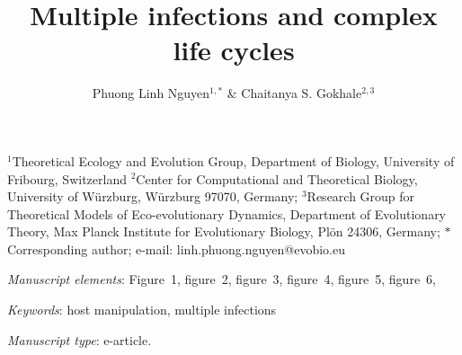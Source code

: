 \documentclass[11pt]{article}
\title{Multiple infections and complex life cycles}
\author{Phuong Linh Nguyen$^{1,\ast}$ \& 
Chaitanya S. Gokhale$^{2,3}$
}
\date{}
\begin{document}
\maketitle

%
\noindent{} $^1$Theoretical Ecology and Evolution Group, Department of Biology, University of Fribourg, Switzerland
\noindent{} $^2$Center for Computational and Theoretical Biology, University of W\"{urzburg}, W\"{urzburg} 97070, Germany;
\noindent{} $^3$Research Group for Theoretical Models of Eco-evolutionary Dynamics, Department of Evolutionary Theory, Max Planck Institute for Evolutionary Biology, Pl\"{o}n 24306, Germany;
%
\noindent{} $\ast$ Corresponding author; e-mail: linh.phuong.nguyen@evobio.eu

\bigskip

\textit{Manuscript elements}:  Figure~1, figure~2, figure~3, figure~4, figure~5, figure~6, %

\bigskip

\textit{Keywords}: host manipulation, multiple infections


\bigskip

\textit{Manuscript type}: e-article. %

\bigskip


\linenumbers{}

\newpage{}
\end{document}
